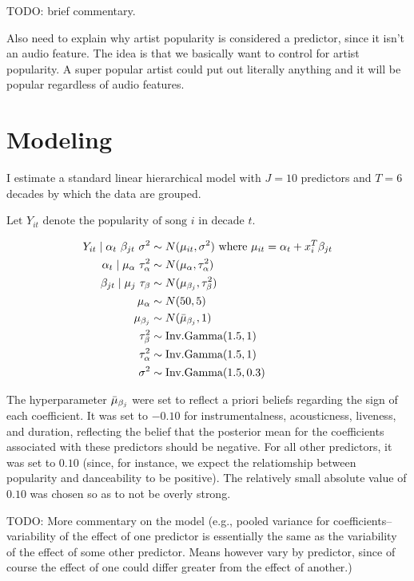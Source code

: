 \documentclass[12pt, twoside]{article}
\begin{document}
TODO: brief commentary.

Also need to explain why artist popularity is considered a predictor, since it isn't an audio feature. The idea is that we basically want to control for artist popularity. A super popular artist could put out literally anything and it will be popular regardless of audio features. 

\section{Modeling}

I estimate a standard linear hierarchical model with $J=10$ predictors and $T=6$ decades by which the data are grouped.

$\text{Let } Y_{it} \text{ denote the popularity of song } i \text{ in decade } t$. 

\begin{align*}
Y_{it} \mid \alpha_t \ \beta_{jt} \ \sigma^2 & \sim N(\mu_{it}, \sigma^2) \text{ where } \mu_{it} = \alpha_t + x_i^T\beta_{jt} \\
\alpha_t \mid \mu_\alpha \ \tau_\alpha^2 & \sim N(\mu_{\alpha}, \tau^2_\alpha) \\
\beta_{jt} \mid \mu_{j} \ \tau_{\beta} & \sim N(\mu_{\beta_j}, \tau_\beta^2) \\
\mu_\alpha & \sim N(50, 5) \\
\mu_{\beta_j} & \sim N(\Bar{\mu}_{\beta_{j}}, 1) \\
\tau_\beta^2 & \sim \text{Inv.Gamma}(1.5, 1) \\
\tau_\alpha^2 & \sim \text{Inv.Gamma}(1.5, 1) \\
\sigma^2 & \sim \text{Inv.Gamma}(1.5, 0.3)
\end{align*}

The hyperparameter $\Bar{\mu}_{\beta_{j}}$ were set to reflect a priori beliefs regarding the sign of each coefficient. It was set to $-0.10$ for instrumentalness, acousticness, liveness, and duration, reflecting the belief that the posterior mean for the coefficients associated with these predictors should be negative. For all other predictors, it was set to $0.10$ (since, for instance, we expect the relatiomship between popularity and danceability to be positive). The relatively small absolute value of $0.10$ was chosen so as to not be overly strong. 

TODO: More commentary on the model (e.g., pooled variance for coefficients--variability of the effect of one predictor is essentially the same as the variability of the effect of some other predictor. Means however vary by predictor, since of course the effect of one could differ greater from the effect of another.)
\end{document}
